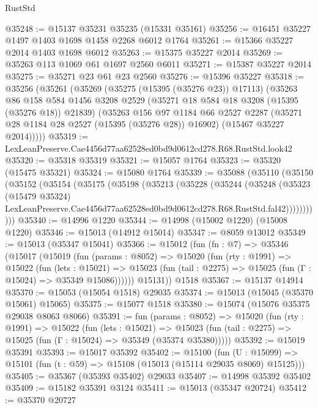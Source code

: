 \begin{lexlean}{RustStd}
\begin{coremodule}
@35248 := @15137 @35231 @35235 (@15331 @35161)
@35256 := @16451 @35227 @1497 @1403 @1698 @1458 @2268 @6012 @1764
@35261 := @15366 @35227 @2014 @1403 @1698 @6012
@35263 := @15375 @35227 @2014
@35269 := @35263 @113 @1069 @61 @1697 @2560 @6011
@35271 := @15387 @35227 @2014
@35275 := @35271 @23 @61 @23 @2560
@35276 := @15396 @35227
@35318 := @35256
    (@35261
      (@35269
        (@35275 (@15395 (@35276 @23)) @17113)
        (@35263
          @86
          @158
          @584
          @1456
          @3208
          @2529
          (@35271 @18 @584 @18 @3208 (@15395 (@35276 @18)) @21839)
          (@35263
            @156
            @97
            @1184
            @66
            @2527
            @2287
            (@35271 @28 @1184 @28 @2527 (@15395 (@35276 @28)) @16902)
            (@15467 @35227 @2014)))))
@35319 := LexLeanPreserve.Cae4456d77aa62528ed0bd9d0612cd278.R68.RustStd.look42
@35320 := @35318 @35319
@35321 := @15057 @1764
@35323 := @35320 (@15475 @35321)
@35324 := @15080 @1764
@35339 := @35088
    (@35110
      (@35150
        (@35152
          (@35154
            (@35175
              (@35198
                (@35213
                  (@35228
                    (@35244
                      (@35248
                        (@35323
                          (@15479 @35324)
                          LexLeanPreserve.Cae4456d77aa62528ed0bd9d0612cd278.R68.RustStd.fal42)))))))))))
@35340 := @14996 @1220
@35344 := @14998 (@15002 @1220) (@15008 @1220)
@35346 := @15013 (@14912 @15014)
@35347 := @8059 @13012
@35349 := @15013 (@35347 @15041)
@35366 := @15012
    (fun (fn : @7) =>
    @35346
      (@15017
        (@15019
          (fun (params : @8052) =>
          @15020
            (fun (rty : @1991) =>
            @15022
              (fun (lets : @15021) =>
              @15023 (fun (tail : @2275) => @15025 (fun (Γ : @15024) => @35349 @15086))))))
        @15131))
    @1518
@35367 := @15137 @14914
@35370 := @15053 (@15054 @1518) @29035
@35374 := @15013 (@15045 (@35370 @15061) @15065)
@35375 := @15077 @1518
@35380 := @15074 (@15076 @35375 @29038 @8063 @8066)
@35391 := fun (params : @8052) =>
  @15020
    (fun (rty : @1991) =>
    @15022
      (fun (lets : @15021) =>
      @15023 (fun (tail : @2275) => @15025 (fun (Γ : @15024) => @35349 (@35374 @35380)))))
@35392 := @15019 @35391
@35393 := @15017 @35392
@35402 := @15100
    (fun (U : @15099) => @15101 (fun (t : @59) => @15108 (@15013 (@15114 @29035 @8069) @15125)))
@35405 := @35367 (@35393 @35402) @29033
@35407 := @14998 @35392 @35402
@35409 := @15182 @35391 @3124
@35411 := @15013 (@35347 @20724)
@35412 := @35370 @20727

\end{coremodule}
\end{lexlean}
